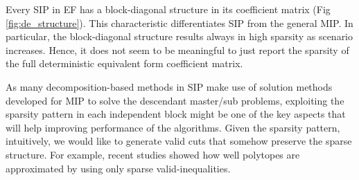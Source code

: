 Every SIP in EF has a block-diagonal structure in its coefficient matrix (Fig \ref{fig:de_structure}). This characteristic differentiates SIP from the general MIP. In particular, the block-diagonal structure results always in high sparsity as scenario increases. Hence, it does not seem to be meaningful to just report the sparsity of the full deterministic equivalent form coefficient matrix.


As many decomposition-based methods in SIP make use of solution methods developed for MIP to solve the descendant master/sub problems, exploiting the sparsity pattern in each independent block might be one of the key aspects that will help improving performance of the algorithms. Given the sparsity pattern, intuitively, we would like to generate valid cuts that somehow preserve the sparse structure. For example, recent studies \cite{DMW2015,DIM2015} showed how well polytopes are approximated by using only sparse valid-inequalities.











